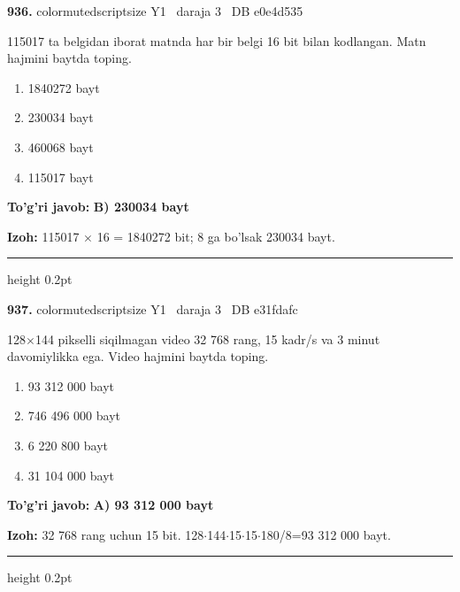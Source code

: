 \documentclass[10pt,a4paper,oneside]{article}
\begin{document}
\noindent\textbf{\color{ink}936.}  {color{muted}scriptsize Y1 \textbullet\ daraja 3 \textbullet\ DB e0e4d535}
\par
115017 ta belgidan iborat matnda har bir belgi 16 bit bilan kodlangan. Matn hajmini baytda toping.
\begin{enumerate}[label=\Alph*),leftmargin=9mm]
\item 1840272 bayt
\item 230034 bayt
\item 460068 bayt
\item 115017 bayt
\end{enumerate}
\begin{tcolorbox}[enhanced,breakable,colback=teal!4,colframe=teal!50!black,boxrule=0.5pt,arc=1.1mm,left=3mm,right=3mm,top=1.7mm,bottom=1.7mm,before skip=2mm,after skip=2mm]
\textbf{\color{teal}To'g'ri javob:} \textbf{B) 230034 bayt}
\par\smallskip
\textbf{Izoh:} 115017 \ensuremath{\times} 16 = 1840272 bit; 8 ga bo'lsak 230034 bayt.
\end{tcolorbox}
\vspace{2mm}\hrule height 0.2pt \vspace{3mm}

\noindent\textbf{\color{ink}937.}  {color{muted}scriptsize Y1 \textbullet\ daraja 3 \textbullet\ DB e31fdafc}
\par
128\ensuremath{\times}144 pikselli siqilmagan video 32 768 rang, 15 kadr/s va 3 minut davomiylikka ega. Video hajmini baytda toping.
\begin{enumerate}[label=\Alph*),leftmargin=9mm]
\item 93 312 000 bayt
\item 746 496 000 bayt
\item 6 220 800 bayt
\item 31 104 000 bayt
\end{enumerate}
\begin{tcolorbox}[enhanced,breakable,colback=teal!4,colframe=teal!50!black,boxrule=0.5pt,arc=1.1mm,left=3mm,right=3mm,top=1.7mm,bottom=1.7mm,before skip=2mm,after skip=2mm]
\textbf{\color{teal}To'g'ri javob:} \textbf{A) 93 312 000 bayt}
\par\smallskip
\textbf{Izoh:} 32 768 rang uchun 15 bit. 128\ensuremath{\cdot}144\ensuremath{\cdot}15\ensuremath{\cdot}15\ensuremath{\cdot}180/8=93 312 000 bayt.
\end{tcolorbox}
\vspace{2mm}\hrule height 0.2pt \vspace{3mm}
\end{document}
